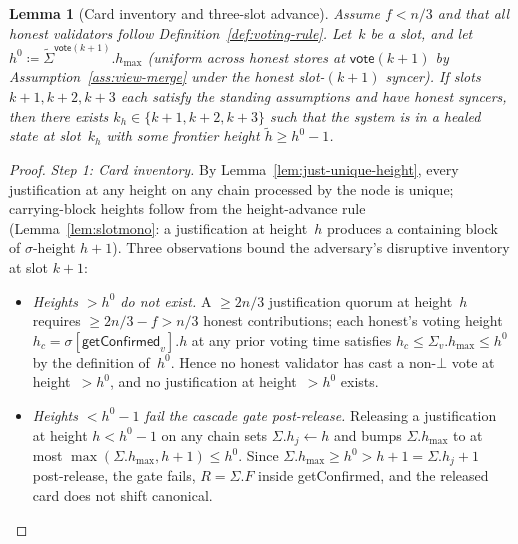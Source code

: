 \ifx\litemode\undefined\documentclass{article}\fi
\newcommand{\hmax}{\ensuremath{h_{\max}}\xspace}
\newcommand{\vote}{\ensuremath{\mathsf{vote}}}
\newcommand{\comm}[1]{\ensuremath{\widetilde{#1}}}
\newcommand{\getConfirmed}{\textsf{getConfirmed}\xspace}
\theoremstyle{plain}
\newtheorem{lemma}{Lemma}
\theoremstyle{definition}
\theoremstyle{remark}
\begin{document}
\begin{lemma}[Card inventory and three-slot advance]\label{lem:healing-3slot-old}
Assume $f < n/3$ and that all honest validators follow Definition~\ref{def:voting-rule}.
Let~$k$ be a slot, and let $h^0 \coloneqq \comm{\Sigma}^{\vote(k+1)}.\hmax$ (uniform across honest stores at $\vote(k+1)$ by Assumption~\ref{ass:view-merge} under the honest slot-$(k+1)$ syncer).
If slots~$k+1, k+2, k+3$ each satisfy the standing assumptions and have honest syncers, then there exists $k_h \in \{k+1, k+2, k+3\}$ such that the system is in a healed state at slot~$k_h$ with some frontier height $\comm{h} \geq h^0 - 1$.
\end{lemma}

\begin{proof}
\emph{Step 1: Card inventory.}
By Lemma~\ref{lem:just-unique-height}, every justification at any height on any chain processed by the node is unique; carrying-block heights follow from the height-advance rule (Lemma~\ref{lem:slotmono}: a justification at height~$h$ produces a containing block of $\sigma$-height $h+1$).
Three observations bound the adversary's disruptive inventory at slot $k+1$:

\begin{itemize}
  \item\emph{Heights $> h^0$ do not exist.}
  A $\geq 2n/3$ justification quorum at height~$h$ requires $\geq 2n/3 - f > n/3$ honest contributions; each honest's voting height $h_c = \sigma[\getConfirmed_v].h$ at any prior voting time satisfies $h_c \leq \Sigma_v.\hmax \leq h^0$ by the definition of~$h^0$.
  Hence no honest validator has cast a non-$\bot$ vote at height~$> h^0$, and no justification at height~$> h^0$ exists.

  \item\emph{Heights $< h^0 - 1$ fail the cascade gate post-release.}
  Releasing a justification at height $h < h^0 - 1$ on any chain sets $\Sigma.h_j \gets h$ and bumps $\Sigma.\hmax$ to at most $\max(\Sigma.\hmax, h + 1) \leq h^0$.
  Since $\Sigma.\hmax \geq h^0 > h + 1 = \Sigma.h_j + 1$ post-release, the gate fails, $R = \Sigma.F$ inside \getConfirmed{}, and the released card does not shift canonical.


\end{itemize}
\end{proof}
\end{document}
